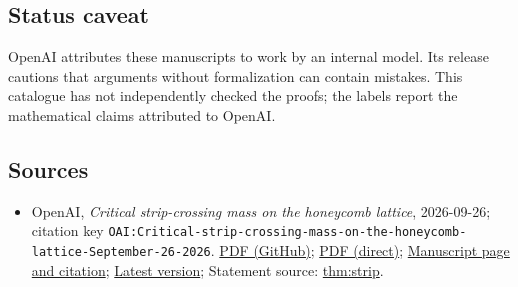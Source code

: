 \documentclass[11pt]{article}
\begin{document}
\subsection{Status caveat}
OpenAI attributes these manuscripts to work by an internal model. Its release cautions that arguments without formalization can contain mistakes. This catalogue has not independently checked the proofs; the labels report the mathematical claims attributed to OpenAI.

\subsection{Sources}
\begin{itemize}
\item OpenAI, \emph{Critical strip-crossing mass on the honeycomb lattice}, 2026-09-26; citation key \texttt{OAI:Critical-strip-crossing-mass-on-the-honeycomb-lattice-September-26-2026}. \href{https://github.com/openai/math/blob/adc7f1241b42e322a6451854ab7e4b4c146bf78a/preprints/Critical-strip-crossing-mass-on-the-honeycomb-lattice-September-26-2026/main.pdf}{PDF (GitHub)}; \href{https://github.com/openai/math/raw/adc7f1241b42e322a6451854ab7e4b4c146bf78a/preprints/Critical-strip-crossing-mass-on-the-honeycomb-lattice-September-26-2026/main.pdf}{PDF (direct)}; \href{https://github.com/openai/math/blob/adc7f1241b42e322a6451854ab7e4b4c146bf78a/preprints/Critical-strip-crossing-mass-on-the-honeycomb-lattice-September-26-2026/README.md}{Manuscript page and citation}; \href{https://github.com/openai/math/blob/main/preprints/Critical-strip-crossing-mass-on-the-honeycomb-lattice-September-26-2026/main.pdf}{Latest version}; Statement source: \href{https://github.com/openai/math/blob/adc7f1241b42e322a6451854ab7e4b4c146bf78a/preprints/Critical-strip-crossing-mass-on-the-honeycomb-lattice-September-26-2026/build/sections/01\_introduction.tex\#L54}{thm:strip}.

\end{itemize}
\end{document}
